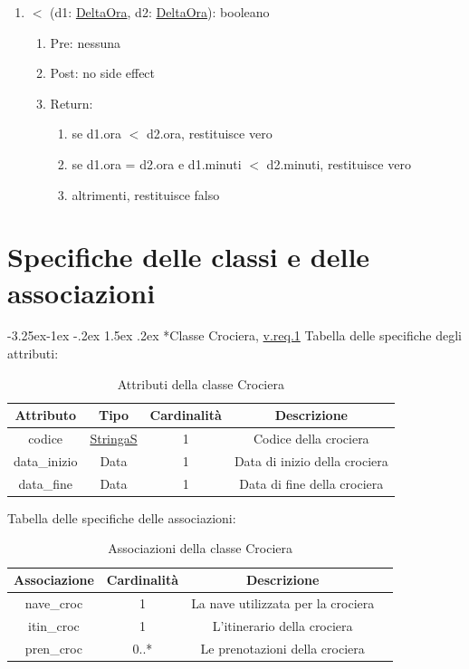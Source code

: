 \documentclass{article}
\makeatletter
\renewcommand\subsection{\@startsection{subsection}{2}{\z@}%
                                     {-3.25ex\@plus -1ex \@minus -.2ex}%
                                     {1.5ex \@plus .2ex}%
                                     {\normalfont\normalsize\bfseries}}
\makeatother
\begin{document}
\begin{enumerate}
    \item $<$ (d1: \hyperref[sec:DeltaOra]{DeltaOra}, d2: \hyperref[sec:DeltaOra]{DeltaOra}): booleano
    \begin{enumerate}
        \item Pre: nessuna
        \item Post: no side effect
        \item Return:
        \begin{enumerate}
            \item se d1.ora $<$ d2.ora, restituisce vero
            \item se d1.ora = d2.ora e d1.minuti $<$ d2.minuti, restituisce vero
            \item altrimenti, restituisce falso
        \end{enumerate}
    \end{enumerate}
\end{enumerate}

\newpage
\section{Specifiche delle classi e delle associazioni}
\subsection*{Classe Crociera, \hyperref[sec:RequisitiCrociera]{v.req.1}}\label{sec:Crociera}
Tabella delle specifiche degli attributi:
\begin{table}[h!]
    \centering
    \begin{tabular}{|c|c|c|c|}
        \hline
        Attributo & Tipo & Cardinalità & Descrizione \\
        \hline
        codice & \hyperref[sec:StringaS]{StringaS} & 1 & Codice della crociera \\
        data\_inizio & Data & 1 & Data di inizio della crociera \\
        data\_fine & Data & 1 & Data di fine della crociera \\
        \hline
    \end{tabular}
    \caption{Attributi della classe Crociera}
\end{table}

Tabella delle specifiche delle associazioni:
\begin{table}[h!]
    \centering
    \begin{tabular}{|c|c|c|c|}
        \hline
        Associazione & Cardinalità & Descrizione \\
        \hline
        nave\_croc & 1 & La nave utilizzata per la crociera \\
        itin\_croc & 1 & L'itinerario della crociera \\
        pren\_croc & 0..* & Le prenotazioni della crociera \\
        \hline
    \end{tabular}
    \caption{Associazioni della classe Crociera}
\end{table}
\end{document}
